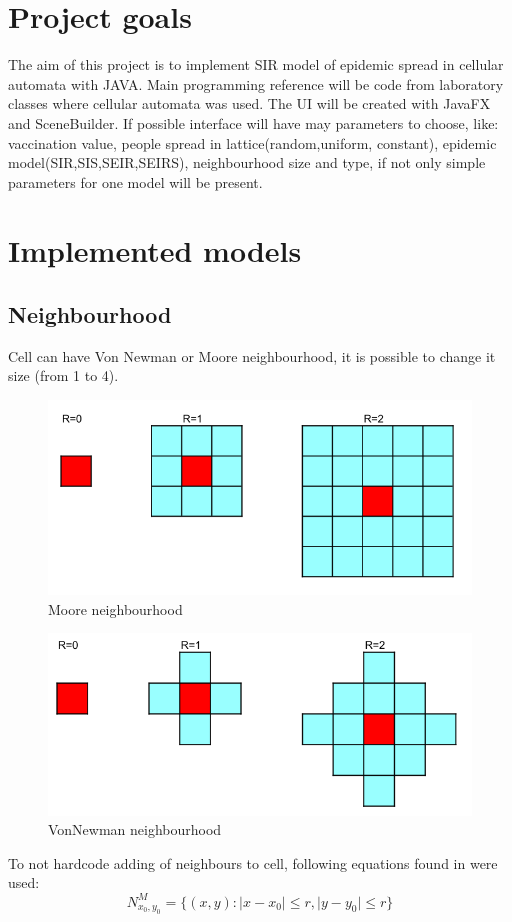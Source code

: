 \documentclass[a4paper, 11pt]{article}
\begin{document}
	

\section{Project goals}

The aim of this project is to implement SIR model of epidemic spread in cellular automata with JAVA. Main programming reference will be code from laboratory classes where cellular automata was used. The UI will be created with JavaFX and SceneBuilder. If possible interface  will have may parameters to choose, like: vaccination value,  people spread in lattice(random,uniform, constant), epidemic model(SIR,SIS,SEIR,SEIRS), neighbourhood size and type, if not only simple parameters for one model will be present. 

\section{Implemented models}
\subsection{Neighbourhood}
Cell can have Von Newman or Moore neighbourhood, it is possible to change it size (from 1 to 4).
\begin{figure}[H]
\includegraphics[scale=0.5]{moore.png} 
\caption{Moore neighbourhood}
\end{figure}
\begin{figure}[H]
\includegraphics[scale=0.5]{vonnewman.png} 
\caption{VonNewman neighbourhood}
\end{figure}
To not hardcode adding of neighbours to cell, following equations found in \cite{moore}\cite{vonnewman} were used:\\
\begin{equation}
	N^{M}_{x_0,y_0}=\{ \left(x,y\right): \mid x-x_0 \mid \leq r, \mid y-y_0 \mid \leq r   \}  
\end{equation}
\end{document}

